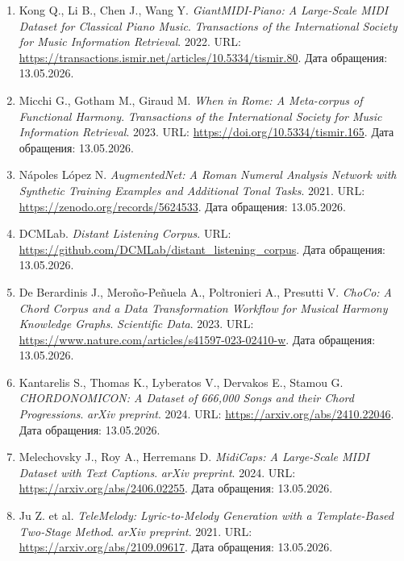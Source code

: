 \documentclass[a4paper,12pt]{extarticle}
\begin{document}
\begin{enumerate}
\item \label{ref:giant-midi} Kong Q., Li B., Chen J., Wang Y. \textit{GiantMIDI-Piano: A Large-Scale MIDI Dataset for Classical Piano Music}. \textit{Transactions of the International Society for Music Information Retrieval}. 2022. URL: \url{https://transactions.ismir.net/articles/10.5334/tismir.80}. Дата обращения: 13.05.2026.

\item \label{ref:when-in-rome} Micchi G., Gotham M., Giraud M. \textit{When in Rome: A Meta-corpus of Functional Harmony}. \textit{Transactions of the International Society for Music Information Retrieval}. 2023. URL: \url{https://doi.org/10.5334/tismir.165}. Дата обращения: 13.05.2026.

\item \label{ref:augmentednet} Nápoles López N. \textit{AugmentedNet: A Roman Numeral Analysis Network with Synthetic Training Examples and Additional Tonal Tasks}. 2021. URL: \url{https://zenodo.org/records/5624533}. Дата обращения: 13.05.2026.

\item \label{ref:distant-listening} DCMLab. \textit{Distant Listening Corpus}. URL: \url{https://github.com/DCMLab/distant_listening_corpus}. Дата обращения: 13.05.2026.

\item \label{ref:choco} De Berardinis J., Meroño-Peñuela A., Poltronieri A., Presutti V. \textit{ChoCo: A Chord Corpus and a Data Transformation Workflow for Musical Harmony Knowledge Graphs}. \textit{Scientific Data}. 2023. URL: \url{https://www.nature.com/articles/s41597-023-02410-w}. Дата обращения: 13.05.2026.

\item \label{ref:chordonomicon} Kantarelis S., Thomas K., Lyberatos V., Dervakos E., Stamou G. \textit{CHORDONOMICON: A Dataset of 666,000 Songs and their Chord Progressions}. \textit{arXiv preprint}. 2024. URL: \url{https://arxiv.org/abs/2410.22046}. Дата обращения: 13.05.2026.


\item \label{ref:midicaps2024} Melechovsky J., Roy A., Herremans D. \textit{MidiCaps: A Large-Scale MIDI Dataset with Text Captions}. \textit{arXiv preprint}. 2024. URL: \url{https://arxiv.org/abs/2406.02255}. Дата обращения: 13.05.2026.

\item \label{ref:ju2022telemelody} Ju Z. et al. \textit{TeleMelody: Lyric-to-Melody Generation with a Template-Based Two-Stage Method}. \textit{arXiv preprint}. 2021. URL: \url{https://arxiv.org/abs/2109.09617}. Дата обращения: 13.05.2026.


\end{enumerate}
\end{document}
